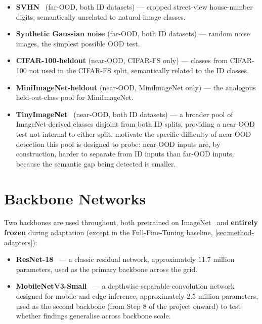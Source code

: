 \documentclass{iutbscthesis}
\begin{document}
\begin{itemize}
    \item \textbf{SVHN}~\cite{netzer2011svhn} (far-OOD, both ID datasets) — cropped street-view house-number digits, semantically unrelated to natural-image classes.
    \item \textbf{Synthetic Gaussian noise} (far-OOD, both ID datasets) — random noise images, the simplest possible OOD test.
    \item \textbf{CIFAR-100-heldout} (near-OOD, CIFAR-FS only) — classes from CIFAR-100 not used in the CIFAR-FS split, semantically related to the ID classes.
    \item \textbf{MiniImageNet-heldout} (near-OOD, MiniImageNet only) — the analogous held-out-class pool for MiniImageNet.
    \item \textbf{TinyImageNet}~\cite{le2015tinyimagenet} (near-OOD, both ID datasets) — a broader pool of ImageNet-derived classes disjoint from both ID splits, providing a near-OOD test not internal to either split. \textcite{malinin2018priornetworks} motivate the specific difficulty of near-OOD detection this pool is designed to probe: near-OOD inputs are, by construction, harder to separate from ID inputs than far-OOD inputs, because the semantic gap being detected is smaller.
\end{itemize}

\section{Backbone Networks}
\label{sec:proto-backbones}

Two backbones are used throughout, both pretrained on ImageNet~\cite{deng2009imagenet} and \textbf{entirely frozen} during adaptation (except in the Full-Fine-Tuning baseline, \autoref{sec:method-adapters}):

\begin{itemize}
    \item \textbf{ResNet-18}~\cite{he2016resnet} — a classic residual network, approximately 11.7 million parameters, used as the primary backbone across the grid.
    \item \textbf{MobileNetV3-Small}~\cite{howard2019mobilenetv3} — a depthwise-separable-convolution network designed for mobile and edge inference, approximately 2.5 million parameters, used as the second backbone (from Step 8 of the project onward) to test whether findings generalise across backbone scale.
\end{itemize}
\end{document}
